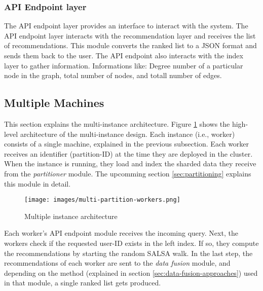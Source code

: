 \subsubsection{API Endpoint layer}
\label{subsubsec:api-endpoint-layer}
The API endpoint layer provides an interface to interact with the system. The API endpoint layer interacts with the recommendation layer and receives the list of recommendations. This module converts the ranked list to a JSON format and sends them back to the user.
The API endpoint also interacts with the index layer to gather information. Informations like: Degree number of a particular node in the graph, total number of nodes, and totall number of edges.

\subsection{Multiple Machines}
\label{Multiple Machines}
This section explains the multi-instance architecture. Figure \ref{fig:multiple-machine-architecture} shows the high-level architecture of the multi-instance design. Each instance (i.e., worker) consists of a single machine, explained in the previous subsection. Each worker receives an identifier (partition-ID) at the time they are deployed in the cluster. When the instance is running, they load and index the sharded data they receive from the \emph{partitioner} module. The upcomming section \ref{sec:partitioning} explains this module in detail. 



\begin{figure}[!h]
	\centering
	\texttt{[image: images/multi-partition-workers.png]}
	\caption{Multiple instance architecture}
	\label{fig:multiple-machine-architecture}
\end{figure}


Each worker's API endpoint module receives the incoming query. Next, the workers check if the requested user-ID exists in the left index. If so, they compute the recommendations by starting the random SALSA walk. In the last step, the recommendations of each worker are sent to the \emph{data fusion} module, and depending on the method (explained in section \ref{sec:data-fusion-approaches}) used in that module, a single ranked list gets produced.

